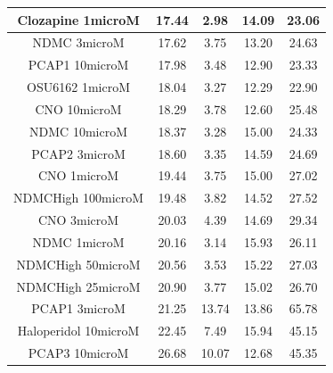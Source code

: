 \documentclass[a4paper,12pt]{article}
\begin{document}
\begin{table}[h!]
\begin{tabular}{|c|c|c|c|c|}
Clozapine 1microM     & 17.44 & 2.98  & 14.09 & 23.06 \\ \hline
NDMC 3microM          & 17.62 & 3.75  & 13.20  & 24.63 \\ \hline
PCAP1 10microM        & 17.98 & 3.48  & 12.90  & 23.33 \\ \hline
OSU6162 1microM       & 18.04 & 3.27  & 12.29 & 22.90  \\ \hline
CNO 10microM          & 18.29 & 3.78  & 12.60  & 25.48 \\ \hline
NDMC 10microM         & 18.37 & 3.28  & 15.00    & 24.33 \\ \hline
PCAP2 3microM         & 18.60  & 3.35  & 14.59 & 24.69 \\ \hline
CNO 1microM           & 19.44 & 3.75  & 15.00    & 27.02 \\ \hline
NDMCHigh 100microM    & 19.48 & 3.82  & 14.52 & 27.52 \\ \hline
CNO 3microM           & 20.03 & 4.39  & 14.69 & 29.34 \\ \hline
NDMC 1microM          & 20.16 & 3.14  & 15.93 & 26.11 \\ \hline
NDMCHigh 50microM     & 20.56 & 3.53  & 15.22 & 27.03 \\ \hline
NDMCHigh 25microM     & 20.90  & 3.77  & 15.02 & 26.70  \\ \hline
PCAP1 3microM         & 21.25 & 13.74 & 13.86 & 65.78 \\ \hline
Haloperidol 10microM  & 22.45 & 7.49  & 15.94 & 45.15 \\ \hline
PCAP3 10microM      & 26.68 & 10.07 & 12.68 & 45.35 \\ \hline
\end{tabular}
\end{table}
\newpage
\end{document}
